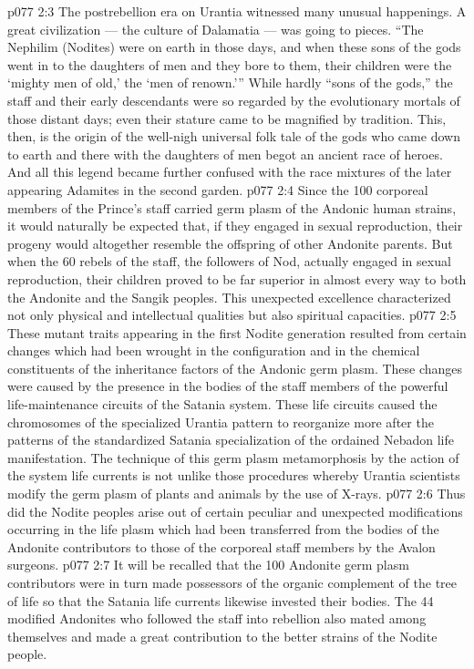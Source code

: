 \vs p077 2:3 The postrebellion era on Urantia witnessed many unusual happenings. A great civilization --- the culture of Dalamatia --- was going to pieces. “The Nephilim (Nodites) were on earth in those days, and when these sons of the gods went in to the daughters of men and they bore to them, their children were the ‘mighty men of old,’ the ‘men of renown.’” While hardly “sons of the gods,” the staff and their early descendants were so regarded by the evolutionary mortals of those distant days; even their stature came to be magnified by tradition. This, then, is the origin of the well\hyp{}nigh universal folk tale of the gods who came down to earth and there with the daughters of men begot an ancient race of heroes. And all this legend became further confused with the race mixtures of the later appearing Adamites in the second garden.
\vs p077 2:4 Since the 100 corporeal members of the Prince’s staff carried germ plasm of the Andonic human strains, it would naturally be expected that, if they engaged in sexual reproduction, their progeny would altogether resemble the offspring of other Andonite parents. But when the 60 rebels of the staff, the followers of Nod, actually engaged in sexual reproduction, their children proved to be far superior in almost every way to both the Andonite and the Sangik peoples. This unexpected excellence characterized not only physical and intellectual qualities but also spiritual capacities.
\vs p077 2:5 These mutant traits appearing in the first Nodite generation resulted from certain changes which had been wrought in the configuration and in the chemical constituents of the inheritance factors of the Andonic germ plasm. These changes were caused by the presence in the bodies of the staff members of the powerful life\hyp{}maintenance circuits of the Satania system. These life circuits caused the chromosomes of the specialized Urantia pattern to reorganize more after the patterns of the standardized Satania specialization of the ordained Nebadon life manifestation. The technique of this germ plasm metamorphosis by the action of the system life currents is not unlike those procedures whereby Urantia scientists modify the germ plasm of plants and animals by the use of X\hyp{}rays.
\vs p077 2:6 Thus did the Nodite peoples arise out of certain peculiar and unexpected modifications occurring in the life plasm which had been transferred from the bodies of the Andonite contributors to those of the corporeal staff members by the Avalon surgeons.
\vs p077 2:7 \pc It will be recalled that the 100 Andonite germ plasm contributors were in turn made possessors of the organic complement of the tree of life so that the Satania life currents likewise invested their bodies. The 44 modified Andonites who followed the staff into rebellion also mated among themselves and made a great contribution to the better strains of the Nodite people.
